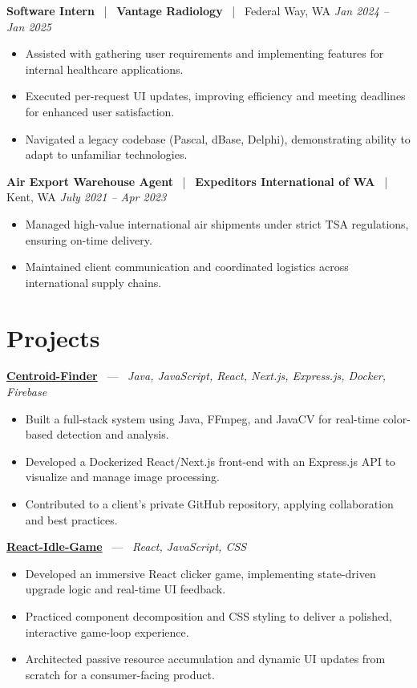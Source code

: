 \documentclass[10pt, letterpaper]{article}
\newcommand{\jobhead}[4]{%
  \vspace{5pt}%
  {\bfseries\color{dark}#1}%
  ~{\color{light}|}~%
  {\bfseries\color{navy}#2}%
  ~{\color{light}|}~%
  {\color{light}#3}%
  \hfill{\color{light}\small\textit{#4}}\\[-2pt]%
}
\newcommand{\projhead}[3]{%
  \vspace{5pt}%
  {\bfseries\color{dark}\href{#2}{#1}}%
  ~{\color{light}---}~%
  {\color{light}\small\textit{#3}}\\[-2pt]%
}
\begin{document}
\jobhead{Software Intern}{Vantage Radiology}{Federal Way, WA}{Jan 2024 – Jan 2025}
\begin{itemize}
  \item Assisted with gathering user requirements and implementing features for internal healthcare applications.
  \item Executed per-request UI updates, improving efficiency and meeting deadlines for enhanced user satisfaction.
  \item Navigated a legacy codebase (Pascal, dBase, Delphi), demonstrating ability to adapt to unfamiliar technologies.
\end{itemize}

\jobhead{Air Export Warehouse Agent}{Expeditors International of WA}{Kent, WA}{July 2021 – Apr 2023}
\begin{itemize}
  \item Managed high-value international air shipments under strict TSA regulations, ensuring on-time delivery.
  \item Maintained client communication and coordinated logistics across international supply chains.
\end{itemize}

\section{Projects}

\projhead{Centroid-Finder}{https://github.com/xavierb117/centroid-finder}{Java, JavaScript, React, Next.js, Express.js, Docker, Firebase}
\begin{itemize}
  \item Built a full-stack system using Java, FFmpeg, and JavaCV for real-time color-based detection and analysis.
  \item Developed a Dockerized React/Next.js front-end with an Express.js API to visualize and manage image processing.
  \item Contributed to a client’s private GitHub repository, applying collaboration and best practices.
\end{itemize}

\projhead{React-Idle-Game}{https://github.com/timmyd4/React-Idle-Game}{React, JavaScript, CSS}
\begin{itemize}
  \item Developed an immersive React clicker game, implementing state-driven upgrade logic and real-time UI feedback.
  \item Practiced component decomposition and CSS styling to deliver a polished, interactive game-loop experience.
  \item Architected passive resource accumulation and dynamic UI updates from scratch for a consumer-facing product.
\end{itemize}
\end{document}
